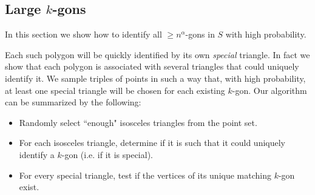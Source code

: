 \documentclass{article}
\newtheorem{lemma}{Lemma}
\newtheorem{defini}{Definition}
\begin{document}
\begin{comment}
\begin{defini}
A \emph{prime-skip triangle} is an isosceles triangle formed by three vertices 
of a regular $k$-gon $P$.  Furthermore,  the two non-apex
vertices (defining the base)
are at a prime number of vertices away from each other in $P$.
\end{defini}
\begin{lemma}
A prime-skip triangle defines a unique  $k$-gon $P$,  the description of which can be
determined in $O(\log n)$ time. 
\end{lemma}
\begin{proof}
The simplest way to determine which one it is in constant time is to build a lookup table of size $O(n^{2})$. If we do not allow hashing, a logarithmic factor is added as we have to look in a binary search tree.
\end{proof}
\noindent The following follows directly from the {\em prime number theorem} (Gauss, 1792;
see~\cite{havil}):
\begin{lemma}
\label{obs1}
A random isosceles triangle chosen from a given regular $k$-gon $G$ will be prime-skip with probability
$\frac{1}{\log n}$.
\end{lemma}
\begin{proof}
Each vertex of $G$ has the same chance of being the apex of a random isosceles triangle.
Without loss of generality, choose the ``topmost" vertex of an axis-symmetric $k$-gon as the apex.  Any isosceles triangle will have a horizontal base.
The vertex-distance (measured in $G$) from apex to non-apex is a uniform distribution from 1
to $\lceil{k/2}\rceil{-}1$, with the exception of the equilateral triangle that is triple-counted
(it will also be selected if the apex is different).
\end{proof}
\end{comment}


\subsection{Large $k$-gons}
\label{subsec:big}
In this section we show how to identify all ${\geq}n^\alpha$-gons in $S$ with high probability.

Each such polygon will be quickly identified by its own {\em special} triangle.  In fact we show that each polygon is associated with several triangles that could uniquely identify it.   We sample triples of points in such a way that, with high probability, at least one special triangle will be chosen for each existing
$k$-gon.  Our algorithm can be summarized by the following:
\begin{itemize}
\item
Randomly select ``enough"
isosceles triangles from the point set.
\item
For each isosceles triangle, determine if it is such that it could uniquely identify a $k$-gon (i.e. if it is special).
\item
For every special triangle,  test if the vertices of its unique matching $k$-gon exist.
\end{itemize}
\end{document}
